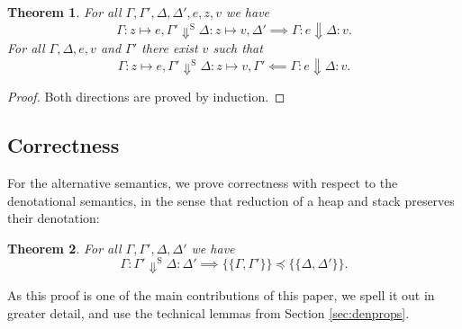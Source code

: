 \documentclass{jfp1}
\newtheorem{theorem}{Theorem}
\theoremstyle{nonumberbreak}
\newtheorem{proof}{Proof}
\newcommand{\sred}[4]{#1 : #2 \Downarrow #3 : #4}
\newcommand{\ssred}[4]{#1 : #2 \Downarrow^{\textrm{S}} #3 : #4}
\newcommand{\esem}[1]{\{\!\!\!\{#1\}\!\!\!\}}
\begin{document}
\begin{theorem}
For all $\Gamma, \Gamma', \Delta, \Delta', e, z, v$ we have
\[
\ssred \Gamma {z \mapsto e, \Gamma'} {\Delta} {z \mapsto v, \Delta'} \implies \sred{\Gamma}e\Delta v.
\]
\label{thm:equiv}
For all $\Gamma, \Delta, e, v$ and $\Gamma'$ there exist $v$ such that
\[
\ssred \Gamma {z \mapsto e, \Gamma'} {\Delta} {z \mapsto v, \Gamma'} \impliedby \sred{\Gamma}e\Delta v.
\]
\end{theorem}

\begin{proof}
Both directions are proved by induction.
\end{proof}

\subsection{Correctness}

For the alternative semantics, we prove correctness with respect to the denotational semantics, in the sense that reduction of a heap and stack preserves their denotation:

\begin{theorem}
For all $\Gamma, \Gamma', \Delta, \Delta'$ we have 
\label{thm:stackedcorrectness}
\[
\ssred \Gamma {\Gamma'} {\Delta} {\Delta'} \implies \esem{\Gamma, \Gamma'} \preceq \esem{\Delta, \Delta'}.
\]
\end{theorem}

As this proof is one of the main contributions of this paper, we spell it out in greater detail, and use the technical lemmas from Section \ref{sec:denprops}.
\end{document}
